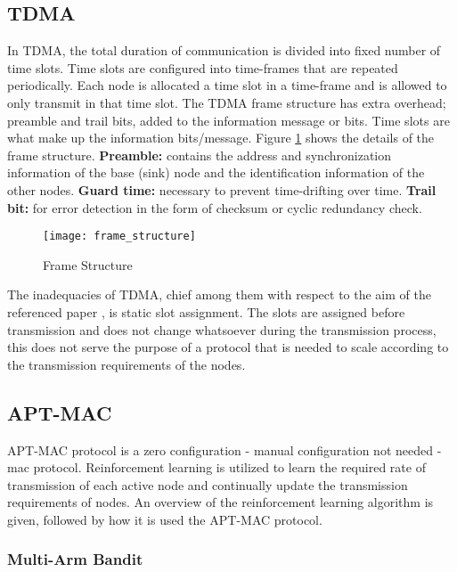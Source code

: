 \subsection{TDMA}
In TDMA, the total duration of communication is divided into fixed number of time slots.
Time slots are configured into time-frames that are repeated periodically.
Each node is allocated a time slot in a time-frame and is allowed to only transmit in that time slot.
The TDMA frame structure has extra overhead; preamble and trail bits, added to the information message or bits.
Time slots are what make up the information bits/message.
Figure \ref{fig:frame_structure} shows the details of the frame structure.\newline
\textbf{Preamble:} contains the address and synchronization information of the base (sink) node and the identification information of the other nodes.\newline
\textbf{Guard time:} necessary to prevent time-drifting over time.\newline
\textbf{Trail bit:} for error detection in the form of checksum or cyclic redundancy check.\newline
\begin{figure}[h]
    \centering
    \texttt{[image: frame\_structure]}
    \caption{Frame Structure}
    \label{fig:frame_structure}
\end{figure} \newline
The inadequacies of TDMA, chief among them with respect to the aim of the referenced paper \cite{Maselli}, is static slot assignment.
The slots are assigned before transmission and does not change whatsoever during the transmission process, this does not serve the purpose of a protocol that is needed to scale according to the transmission requirements of the nodes.

\subsection{APT-MAC}
APT-MAC protocol is a zero configuration - manual configuration not needed - mac protocol.
Reinforcement learning is utilized to learn the required rate of transmission of each active node and continually update the transmission requirements of nodes.
An overview of the reinforcement learning algorithm is given, followed by how it is used the APT-MAC protocol.
\subsubsection{Multi-Arm Bandit}
    
